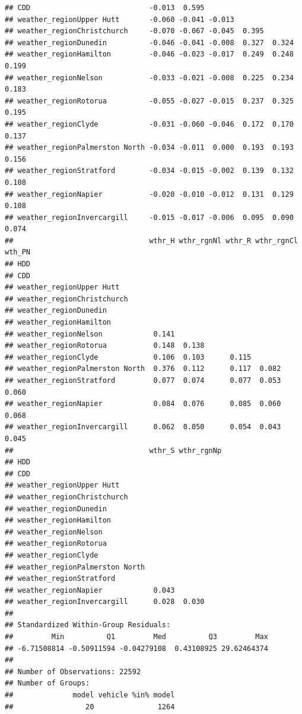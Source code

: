 \documentclass[
]{article}
\begin{document}
\begin{verbatim}
## CDD                            -0.013  0.595                                
## weather_regionUpper Hutt       -0.060 -0.041 -0.013                         
## weather_regionChristchurch     -0.070 -0.067 -0.045  0.395                  
## weather_regionDunedin          -0.046 -0.041 -0.008  0.327  0.324           
## weather_regionHamilton         -0.046 -0.023 -0.017  0.249  0.248      0.199
## weather_regionNelson           -0.033 -0.021 -0.008  0.225  0.234      0.183
## weather_regionRotorua          -0.055 -0.027 -0.015  0.237  0.325      0.195
## weather_regionClyde            -0.031 -0.060 -0.046  0.172  0.170      0.137
## weather_regionPalmerston North -0.034 -0.011  0.000  0.193  0.193      0.156
## weather_regionStratford        -0.034 -0.015 -0.002  0.139  0.132      0.108
## weather_regionNapier           -0.020 -0.010 -0.012  0.131  0.129      0.108
## weather_regionInvercargill     -0.015 -0.017 -0.006  0.095  0.090      0.074
##                                wthr_H wthr_rgnNl wthr_R wthr_rgnCl wth_PN
## HDD                                                                      
## CDD                                                                      
## weather_regionUpper Hutt                                                 
## weather_regionChristchurch                                               
## weather_regionDunedin                                                    
## weather_regionHamilton                                                   
## weather_regionNelson            0.141                                    
## weather_regionRotorua           0.148  0.138                             
## weather_regionClyde             0.106  0.103      0.115                  
## weather_regionPalmerston North  0.376  0.112      0.117  0.082           
## weather_regionStratford         0.077  0.074      0.077  0.053      0.060
## weather_regionNapier            0.084  0.076      0.085  0.060      0.068
## weather_regionInvercargill      0.062  0.050      0.054  0.043      0.045
##                                wthr_S wthr_rgnNp
## HDD                                             
## CDD                                             
## weather_regionUpper Hutt                        
## weather_regionChristchurch                      
## weather_regionDunedin                           
## weather_regionHamilton                          
## weather_regionNelson                            
## weather_regionRotorua                           
## weather_regionClyde                             
## weather_regionPalmerston North                  
## weather_regionStratford                         
## weather_regionNapier            0.043           
## weather_regionInvercargill      0.028  0.030    
## 
## Standardized Within-Group Residuals:
##         Min          Q1         Med          Q3         Max 
## -6.71508814 -0.50911594 -0.04279108  0.43108925 29.62464374 
## 
## Number of Observations: 22592
## Number of Groups: 
##              model vehicle %in% model 
##                 20               1264
\end{verbatim}
\end{document}
